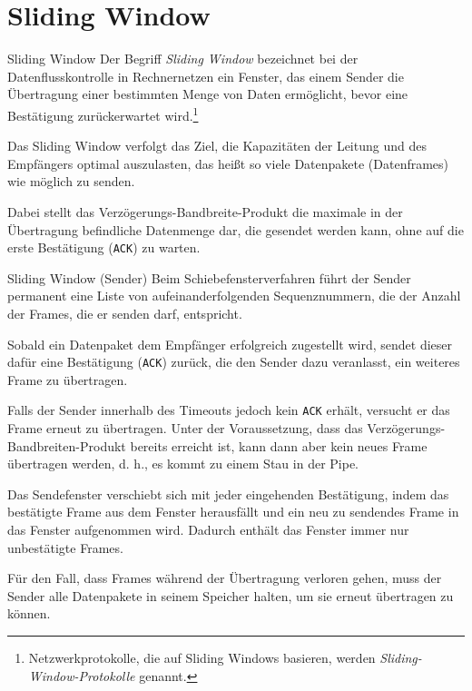 \section{Sliding Window}

\begin{defi}{Sliding Window}
    Der Begriff \emph{Sliding Window} bezeichnet bei der Datenflusskontrolle in Rechnernetzen ein Fenster, das einem Sender die Übertragung einer bestimmten Menge von Daten ermöglicht, bevor eine Bestätigung zurückerwartet wird.\footnote{Netzwerkprotokolle, die auf Sliding Windows basieren, werden \emph{Sliding-Window-Protokolle} genannt.}

    Das Sliding Window verfolgt das Ziel, die Kapazitäten der Leitung und des Empfängers optimal auszulasten, das heißt so viele Datenpakete (Datenframes) wie möglich zu senden.

    Dabei stellt das Verzögerungs-Bandbreite-Produkt die maximale in der Übertragung befindliche Datenmenge dar, die gesendet werden kann, ohne auf die erste Bestätigung (\texttt{ACK}) zu warten.
\end{defi}

\begin{defi}{Sliding Window (Sender)}
    Beim Schiebefensterverfahren führt der Sender permanent eine Liste von aufeinanderfolgenden Sequenznummern, die der Anzahl der Frames, die er senden darf, entspricht.

    Sobald ein Datenpaket dem Empfänger erfolgreich zugestellt wird, sendet dieser dafür eine Bestätigung (\texttt{ACK}) zurück, die den Sender dazu veranlasst, ein weiteres Frame zu übertragen.

    Falls der Sender innerhalb des Timeouts jedoch kein \texttt{ACK} erhält, versucht er das Frame erneut zu übertragen.
    Unter der Voraussetzung, dass das Verzögerungs-Bandbreiten-Produkt bereits erreicht ist, kann dann aber kein neues Frame übertragen werden, d. h., es kommt zu einem Stau in der Pipe.

    Das Sendefenster verschiebt sich mit jeder eingehenden Bestätigung, indem das bestätigte Frame aus dem Fenster herausfällt und ein neu zu sendendes Frame in das Fenster aufgenommen wird.
    Dadurch enthält das Fenster immer nur unbestätigte Frames.

    Für den Fall, dass Frames während der Übertragung verloren gehen, muss der Sender alle Datenpakete in seinem Speicher halten, um sie erneut übertragen zu können.
\end{defi}

